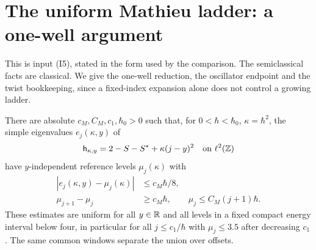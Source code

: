 \section{The uniform Mathieu ladder: a one-well argument}\label{app:mathieu}
This is input (I5), stated in the form used by the comparison. The semiclassical facts are classical. We give the one-well reduction, the oscillator endpoint and the twist bookkeeping, since a fixed-index expansion alone does not control a growing ladder.

\begin{inputbox}
\begin{classicalinput}
There are absolute $c_M,C_M,c_1,\hbar_0>0$ such that, for $0<\hbar<\hbar_0$, $\kappa=\hbar^2$, the simple eigenvalues $e_j(\kappa,y)$ of
\[
 \mathsf h_{\kappa,y}=2-S-S^*+\kappa(j-y)^2
 \quad\hbox{on }\ell^2(\mathbb Z)
\]
have $y$-independent reference levels $\mu_j(\kappa)$ with
\begin{equation}\label{eq:Mladder}
 \begin{split}
 |e_j(\kappa,y)-\mu_j(\kappa)|&\le c_M\hbar/8,\\
 \mu_{j+1}-\mu_j&\ge c_M\hbar,\qquad
 \mu_j\le C_M(j+1)\hbar.
 \end{split}
\end{equation}
These estimates are uniform for all $y\in\mathbb R$ and all levels in a fixed compact energy interval below four, in particular for all $j\le c_1/\hbar$ with $\mu_j\le3.5$ after decreasing $c_1$. The same common windows separate the union over offsets.
\end{classicalinput}
\end{inputbox}
